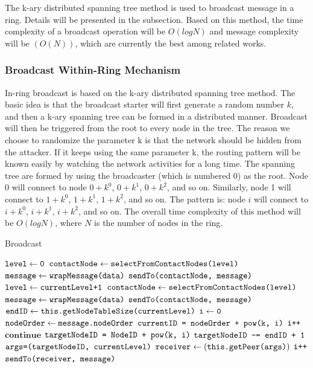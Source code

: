 The k-ary distributed spanning tree method \cite{el2003efficient} is used to broadcast message in a ring. Details will be presented in the subsection. Based on this method, the time complexity of a broadcast operation will be $O(logN)$ and message complexity will be $(O(N))$, which are currently the best among related works.

\subsubsection{Broadcast Within-Ring Mechanism}

In-ring broadcast is based on the k-ary distributed spanning tree method. The basic idea is that the broadcast starter will first generate a random number $k$, and then a k-ary spanning tree can be formed in a distributed manner. Broadcast will then be triggered from the root to every node in the tree. The reason we choose to randomize the parameter k is that the network should be hidden from the attacker. If it keeps using the same parameter k, the routing pattern will be known easily by watching the network activities for a long time. The spanning tree are formed by using the broadcaster (which is numbered 0) as the root. Node 0 will connect to node $0+k^0$, $0+k^1$, $0+k^2$, and so on. Similarly, node 1 will connect to $1+k^0$, $1+k^1$, $1+k^2$, and so on. The pattern is: node $i$ will connect to $i+k^0$, $i+k^1$, $i+k^2$, and so on. The overall time complexity of this method will be $O(logN)$, where $N$ is the number of nodes in the ring.

\begin{algorithm}[t]
	\caption{Broadcast}\label{euclid}
	\begin{algorithmic}[1]
		\State $\texttt{level} \gets \texttt{0}$
		\State $\texttt{contactNode} \gets \texttt{selectFromContactNodes(level)}$
		\State $\texttt{message} \gets \texttt{wrapMessage(data)}$
		\State $\texttt{sendTo(contactNode, message)}$
		\EndFunction
		\\
		\State $\texttt{level} \gets \texttt{currentLevel+1}$
		\State $\texttt{contactNode} \gets \texttt{selectFromContactNodes(level)}$
		\State $\texttt{message} \gets \texttt{wrapMessage(data)}$
		\State $\texttt{sendTo(contactNode, message)}$
		\EndFunction
		\\
		\State $\texttt{endID} \gets \texttt{this.getNodeTableSize(currentLevel)}$
		\State $\texttt{i} \gets \texttt{0}$
		\State $\texttt{nodeOrder} \gets \texttt{message.nodeOrder}$
		\State $\texttt{currentID = nodeOrder + pow(k, i)}$
			\State $\texttt{i++}$
			\State $\textbf{continue}$
			\Else
			\State $\texttt{targetNodeID = NodeID + pow(k, i)}$
			\State $\texttt{targetNodeID -= endID + 1}$
			\EndIf
			\State $\texttt{args=(targetNodeID, currentLevel)}$
			\State $\texttt{receiver} \gets (\texttt{this.getPeer(args)})$
			\State $\texttt{i++}$
			\State $\texttt{sendTo(receiver, message)}$
			\EndIf
		\EndWhile
		\EndFunction
	\end{algorithmic}
\end{algorithm}

